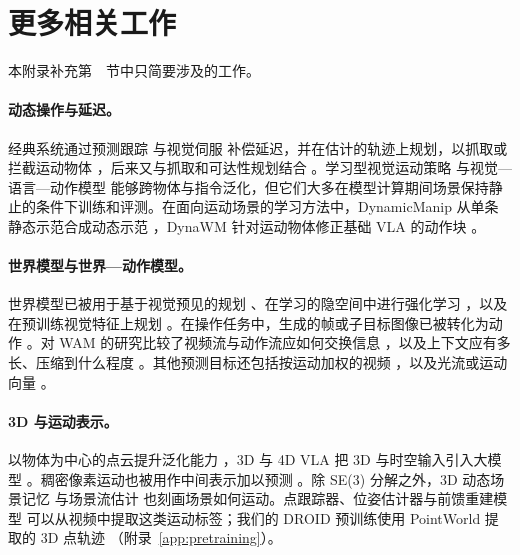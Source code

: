 \section{更多相关工作}
\label{app:related}
本附录补充第~~节中只简要涉及的工作。

\paragraph{动态操作与延迟。}经典系统通过预测跟踪 \cite{azuma1994} 与视觉伺服 \cite{hutchinson1996} 补偿延迟，并在估计的轨迹上规划，以抓取或拦截运动物体 \cite{hove1991,allen1993,baeuml2010}，后来又与抓取和可达性规划结合 \cite{marturi2019dynamic,akinola2021dynamic}。学习型视觉运动策略 \cite{act,diffusionpolicy} 与视觉—语言—动作模型 \cite{rt1,rt2,octo,openvla,pi0,pi05} 能够跨物体与指令泛化，但它们大多在模型计算期间场景保持静止的条件下训练和评测。在面向运动场景的学习方法中，DynamicManip 从单条静态示范合成动态示范 \cite{dynamicmanip}，DynaWM 针对运动物体修正基础 VLA 的动作块 \cite{dynawm}。

\paragraph{世界模型与世界—动作模型。}世界模型已被用于基于视觉预见的规划 \cite{finn2017deep}、在学习的隐空间中进行强化学习 \cite{dreamerv3,tdmpc2}，以及在预训练视觉特征上规划 \cite{dinowm,vjepa2}。在操作任务中，生成的帧或子目标图像已被转化为动作 \cite{unipi,susie,cotvla}。对 WAM 的研究比较了视频流与动作流应如何交换信息 \cite{openwam_alpha,openwam}，以及上下文应有多长、压缩到什么程度 \cite{longwam,pactwam}。其他预测目标还包括按运动加权的视频 \cite{dcwam}，以及光流或运动向量 \cite{flowwam,hifvla}。

\paragraph{3D 与运动表示。}以物体为中心的点云提升泛化能力 \cite{groot}，3D 与 4D VLA 把 3D 与时空输入引入大模型 \cite{3dvla,4dvla}。稠密像素运动也被用作中间表示加以预测 \cite{langtomo,dawn,fofpred}。除 SE(3) 分解之外，3D 动态场景记忆 \cite{dsr} 与场景流估计 \cite{flownet3d,raft3d} 也刻画场景如何运动。点跟踪器、位姿估计器与前馈重建模型 \cite{cotracker,spatialtracker,foundationpose,vggt,d4rt} 可以从视频中提取这类运动标签；我们的 DROID 预训练使用 PointWorld 提取的 3D 点轨迹 \cite{pointworld}（附录~\ref{app:pretraining}）。
